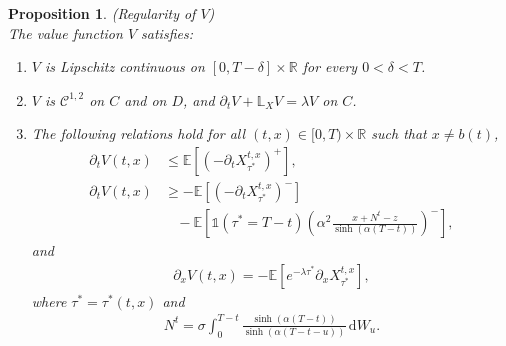 \documentclass{tufte-handout}
\newcommand{\E}{\mathbb{E}} %
\newcommand{\R}{\mathbb{R}} %
\newtheorem{pr}{Proposition}
\begin{document}
	\begin{pr}(Regularity of $V$)\label{pr:V_regularity}\\
		The value function $V$ satisfies:
		\begin{enumerate}[label=(\roman{*}), ref=(\textit{\roman{*}})]
			\item \label{pr:V_Lcontinuous} $V$ is Lipschitz continuous on $[0, T - \delta]\times\R$ for every $0 < \delta < T$. 
			\item \label{pr:V_C^12onC} $V$ is $\mathcal{C}^{1,2}$ on $C$ and on $D$, and $\partial_tV + \mathbb{L}_{X}V = \lambda V$ on $C$. 
			\item \label{pr:V_x-V_t} The following relations hold for all $(t, x) \in [0, T)\times\R$ such that $x\neq b(t)$,
			\begin{align}
			\partial_t V(t, x) &\leq \E\left[\left(-\partial_t X_{\tau^*}^{t, x}\right)^+\right], \label{eq:Vt_up} \\		
			\partial_t V(t, x) &\geq - \E\left[\left(-\partial_t X_{\tau^*}^{t, x}\right)^-\right] \nonumber \\
			&\ \ \ \ - \E\left[\mathbb{1}(\tau^* = T - t)\left(\alpha^2\frac{x + N^t - z}{\sinh(\alpha (T - t))}\right)^-\right], \label{eq:Vt_low}
			\end{align}
			and
			\begin{align}\label{eq:V_x}
			\partial_xV(t, x) = -\E\left[e^{-\lambda\tau^*}\partial_x X_{\tau^*}^{t, x}\right],
			\end{align} 
			where $\tau^* = \tau^*(t, x)$ and 
			\begin{align}\label{eq:N^t}
			N^t = \sigma\int_{0}^{T - t} \frac{\sinh(\alpha (T - t))}{\sinh(\alpha (T - t - u))}\,\mathrm{d}W_u. 
			\end{align} 			
		\end{enumerate}
	\end{pr}
	
\end{document}
